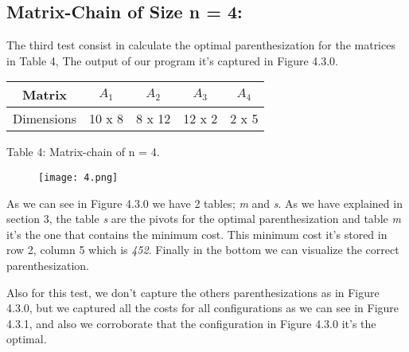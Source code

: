 \subsection{Matrix-Chain of Size n = 4:}

The third test consist in calculate the optimal parenthesization for the matrices in Table 4, The output of our program it's captured in Figure 4.3.0. \hfill \break

\begin{center}
\begin{tabular}{c c c c c}
\toprule
\toprule
\hspace{10px} Matrix \hspace{10px} & \hspace{35px} $A_{1}$ \hspace{35px} & \hspace{35px} $A_{2}$ \hspace{35px} & \hspace{35px} $A_{3}$ \hspace{35px} & \hspace{35px} $A_{4}$ \hspace{35px} \\
\toprule
\toprule
Dimensions & 10 x 8 & 8 x 12 & 12 x 2 & 2 x 5 \\
\bottomrule
\end{tabular}
\linebreak \linebreak Table 4: Matrix-chain of n = 4.
\end{center} \hfill

\begin{figure}[H]
\texttt{[image: 4.png]}
\centering \linebreak {}
\end{figure} \hfill

As we can see in Figure 4.3.0 we have 2 tables; {\itshape m} and {\itshape s}. As we have explained in section 3, the table {\itshape s} are the pivots for the optimal parenthesization and table {\itshape m} it's the one that contains the minimum cost. This minimum cost it's stored in row 2, column 5 which is {\itshape 452}. Finally in the bottom we can visualize the correct parenthesization. 

\pagebreak

Also for this test, we don't capture the others parenthesizations as in Figure 4.3.0, but we captured all the costs for all configurations as we can see in Figure 4.3.1, and also we corroborate that the configuration in Figure 4.3.0 it's the optimal. \hfill \break

